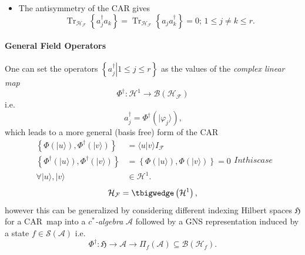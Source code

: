 \documentclass[aps, preprint]{revtex4}
\begin{document}
\begin{itemize}
\item The antisymmetry of the CAR gives
\begin{equation}\ensuremath{\operatorname*{Tr}}_{\mathcal{H}_{\mathcal{F}}} \left \{a_{j}^{\dag } a_{k}\right \} =\ensuremath{\operatorname*{Tr}}_{\mathcal{H}_{\mathcal{F}}} \left \{a_{j} a_{k}^{\dag }\right \} =0 ;\,1 \leq j \neq k \leq r\text{.}
\end{equation}\end{itemize}


\paragraph{General Field Operators}
One can set the operators $\left \{\left .a_{j}^{ \dag }\right \vert 1 \leq j \leq r\right \}$ as the values of the \emph{complex linear map}
\begin{equation}\Phi ^{ \dag } :\mathcal{H}^{1} \rightarrow \mathcal{B} \left (\mathcal{H}_{\mathcal{F}}\right )
\end{equation}i.e.
\begin{equation}a_{j}^{ \dag } =\Phi ^{ \dag } \left (\vert \varphi _{j} \rangle \right )\text{,}
\end{equation}which leads to a more general (basis free) form of the CAR
\begin{subequations}
\begin{align}\left \{\Phi  \left (\vert u \rangle \right ) ,\Phi ^{ \dag } \left (\vert v \rangle \right )\right \} &  = \langle \left .u\right \vert v \rangle  I_{\mathcal{F}} \\
\left \{\Phi ^{ \dag } \left (\vert u \rangle \right ) ,\Phi ^{ \dag } \left (\vert v \rangle \right )\right \} &  =\left \{\Phi  \left (\vert u \rangle \right ) ,\Phi  \left (\vert v \rangle \right )\right \} =0 \\
 \forall \vert u \rangle  ,\vert v \rangle  &  \in \mathcal{H}^{1}\text{.}\end{align}In this case
\end{subequations}
\begin{equation}\mathcal{H}_{\mathcal{F}} = \tbigwedge \left (\mathcal{H}^{1}\right )\text{,}
\end{equation}however this can be generalized by considering different indexing Hilbert spaces $\mathfrak{H}$ for a CAR\ map into a $c^{ \ast }$\emph{-algebra} $\mathcal{A}$ followed by a GNS representation induced by a state $f \in \mathcal{S} \left (\mathcal{A}\right )$ i.e.
\begin{equation}\Phi ^{ \dag } :\mathfrak{H} \rightarrow \mathcal{A} \rightarrow \Pi _{f} \left (\mathcal{A}\right ) \subseteq \mathcal{B} \left (\mathcal{H}_{f}\right )\text{.}
\end{equation}
\end{document}
